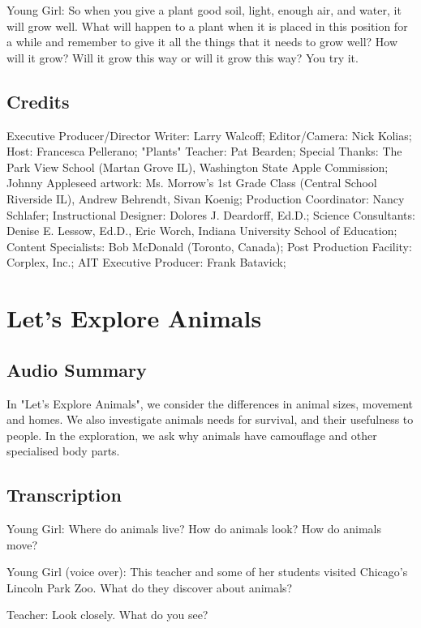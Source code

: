 Young Girl: So when you give a plant good soil, light, enough air, and water, it will grow well. What will happen to a plant when it is placed in this position for a while and remember to give it all the things that it needs to grow well? How will it grow? Will it grow this way or will it grow this way? You try it.

\subsection{Credits}

Executive Producer/Director Writer: Larry Walcoff;
Editor/Camera: Nick Kolias;
Host: Francesca Pellerano;
"Plants" Teacher: Pat Bearden;
Special Thanks: The Park View School (Martan Grove IL), Washington State Apple Commission;
Johnny Appleseed artwork: Ms. Morrow's 1st Grade Class (Central School Riverside IL), Andrew Behrendt, Sivan Koenig;
Production Coordinator: Nancy Schlafer;
Instructional Designer: Dolores J. Deardorff, Ed.D.;
Science Consultants: Denise E. Lessow, Ed.D., Eric Worch, Indiana University School of Education;
Content Specialists: Bob McDonald (Toronto, Canada);
Post Production Facility: Corplex, Inc.;
AIT Executive Producer: Frank Batavick;

\section{Let's Explore Animals}

\subsection{Audio Summary}

In "Let's Explore Animals", we consider the differences in animal sizes, movement and homes. We also investigate animals needs for survival, and their usefulness to people. In the exploration, we ask why animals have camouflage and other specialised body parts.

\subsection{Transcription}

Young Girl: Where do animals live? How do animals look? How do animals move?

Young Girl (voice over): This teacher and some of her students visited Chicago's Lincoln Park Zoo. What do they discover about animals?

Teacher: Look closely. What do you see?

